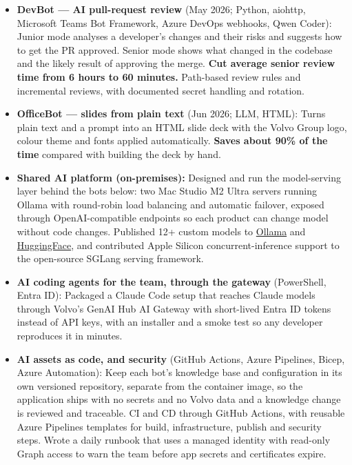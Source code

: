 \documentclass[a4paper,10pt]{article}
\begin{document}
\begin{itemize}
  \item \textbf{DevBot --- AI pull-request review} (May 2026; Python, aiohttp, Microsoft Teams Bot Framework, Azure DevOps webhooks, Qwen Coder): Junior mode analyses a developer's changes and their risks and suggests how to get the PR approved. Senior mode shows what changed in the codebase and the likely result of approving the merge. \textbf{Cut average senior review time from 6 hours to 60 minutes.} Path-based review rules and incremental reviews, with documented secret handling and rotation.

  \item \textbf{OfficeBot --- slides from plain text} (Jun 2026; LLM, HTML): Turns plain text and a prompt into an HTML slide deck with the Volvo Group logo, colour theme and fonts applied automatically. \textbf{Saves about 90\% of the time} compared with building the deck by hand.

  \item \textbf{Shared AI platform (on-premises):} Designed and run the model-serving layer behind the bots below: two Mac Studio M2 Ultra servers running Ollama with round-robin load balancing and automatic failover, exposed through OpenAI-compatible endpoints so each product can change model without code changes. Published 12+ custom models to \href{https://ollama.com/bluehawana}{Ollama} and \href{https://huggingface.co/bluehawana}{HuggingFace}, and contributed Apple Silicon concurrent-inference support to the open-source SGLang serving framework.

  \item \textbf{AI coding agents for the team, through the gateway} (PowerShell, Entra ID): Packaged a Claude Code setup that reaches Claude models through Volvo's GenAI Hub AI Gateway with short-lived Entra ID tokens instead of API keys, with an installer and a smoke test so any developer reproduces it in minutes.

  \item \textbf{AI assets as code, and security} (GitHub Actions, Azure Pipelines, Bicep, Azure Automation): Keep each bot's knowledge base and configuration in its own versioned repository, separate from the container image, so the application ships with no secrets and no Volvo data and a knowledge change is reviewed and traceable. CI and CD through GitHub Actions, with reusable Azure Pipelines templates for build, infrastructure, publish and security steps. Wrote a daily runbook that uses a managed identity with read-only Graph access to warn the team before app secrets and certificates expire.


\end{itemize}
\end{document}
